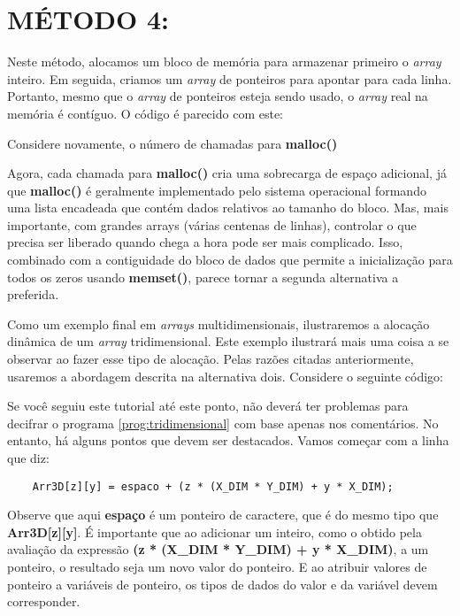 \section*{MÉTODO 4:}
Neste método, alocamos um bloco de memória para armazenar primeiro o \textit{array} inteiro. Em seguida, criamos um \textit{array} de ponteiros para apontar para cada linha. Portanto, mesmo que o \textit{array} de ponteiros esteja sendo usado, o \textit{array} real na memória é contíguo. O código é parecido com este:


Considere novamente, o número de chamadas para \textbf{malloc()}


Agora, cada chamada para \textbf{malloc()} cria uma sobrecarga de espaço adicional, já que \textbf{malloc()} é geralmente implementado pelo sistema operacional formando uma lista encadeada que contém dados relativos ao tamanho do bloco. Mas, mais importante, com grandes arrays (várias centenas de linhas), controlar o que precisa ser liberado quando chega a hora pode ser mais complicado. Isso, combinado com a contiguidade do bloco de dados que permite a inicialização para todos os zeros usando \textbf{memset()}, parece tornar a segunda alternativa a preferida.

Como um exemplo final em \textit{arrays} multidimensionais, ilustraremos a alocação dinâmica de um \textit{array} tridimensional. Este exemplo ilustrará mais uma coisa a se observar ao fazer esse tipo de alocação. Pelas razões citadas anteriormente, usaremos a abordagem descrita na alternativa dois. Considere o seguinte código:


Se você seguiu este tutorial até este ponto, não deverá ter problemas para decifrar o programa \ref{prog:tridimensional} com base apenas nos comentários. No entanto, há alguns pontos que devem ser destacados. Vamos começar com a linha que diz:
\begin{lstlisting}
	Arr3D[z][y] = espaco + (z * (X_DIM * Y_DIM) + y * X_DIM);
\end{lstlisting}

Observe que aqui \textbf{espaço} é um ponteiro de caractere, que é do mesmo tipo que \textbf{Arr3D[z][y]}. É importante que ao adicionar um inteiro, como o obtido pela avaliação da expressão \textbf{(z * (X\_DIM * Y\_DIM) + y * X\_DIM)}, a um ponteiro, o resultado seja um novo valor do ponteiro. E ao atribuir valores de ponteiro a variáveis de ponteiro, os tipos de dados do valor e da variável devem corresponder.
